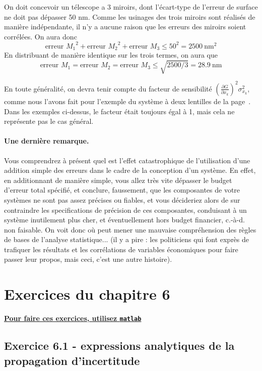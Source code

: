 \documentclass[main.tex]{subfiles}
\begin{document}
On doit concevoir un télescope a 3 miroirs, dont l'écart-type de l'erreur de surface ne doit pas dépasser 50 nm. Comme les usinages des trois miroirs sont réalisés de manière indépendante, il n'y a aucune raison que les erreurs des miroirs soient corrélées. On aura donc
$$
    \text{erreur $M_1$}^2+\text{erreur $M_2$}^2+\text{erreur $M_3$}\le 50^2=2500\ \text{nm}^2
$$
En distribuant de manière identique sur les trois termes, on aura que
$$
    \text{erreur $M_1$}=\text{erreur $M_2$}=\text{erreur $M_3$}\le \sqrt{2500/3}=28.9\ \text{nm}
$$

En toute généralité, on devra tenir compte du facteur de sensibilité $\left(\frac{\partial G}{\partial x_k}\right)^2\sigma_{x_k}^2$, comme nous l'avons fait pour l'exemple du système à deux lentilles de la page~\pageref{sec:exopt}. Dans les exemples ci-dessus, le facteur était toujours égal à 1, mais cela ne représente pas le cas général.

\paragraph{Une dernière remarque.} Vous comprendrez à présent quel est l'effet catastrophique de l'utilisation d'une addition simple des erreurs dans le cadre de la conception d'un système. En effet, en additionnant de manière simple, vous allez très vite dépasser le budget d'erreur total spécifié, et conclure, faussement, que les composantes de votre systèmes ne sont pas assez précises ou fiables, et vous décideriez alors de sur contraindre les specifications de précision de ces composantes, conduisant à un système inutilement plus cher, et éventuellement hors budget financier, c.-à-d. non faisable. On voit donc où peut mener une mauvaise compréhension des règles de bases de l'analyse statistique... (il y a pire : les politiciens qui font exprès de trafiquer les résultats et les corrélations de variables économiques pour faire passer leur propos, mais ceci, c'est une autre histoire).

\section{Exercices du chapitre 6}

\begin{center}
    \Large \bf {\underline{Pour faire ces exercices, utilisez \texttt{matlab}}}
\end{center}

\subsection*{Exercice 6.1 - expressions analytiques de la propagation d'incertitude}
\end{document}
